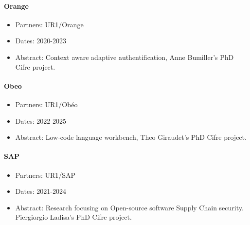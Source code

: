 \paragraph*{Orange}
\begin{participants}
\end{participants}

\begin{itemize}\itemsep0cm
	\item Partners: UR1/Orange
	\item Dates: 2020-2023
	\item Abstract: Context aware adaptive authentification,  Anne Bumiller's PhD Cifre project.
\end{itemize}


\paragraph*{Obeo}
\begin{participants}
\end{participants}

\begin{itemize}\itemsep0cm
	\item Partners: UR1/Obéo
	\item Dates: 2022-2025
	\item Abstract: Low-code language workbench, Theo Giraudet's PhD Cifre project.	 
\end{itemize}


\paragraph*{SAP}
\begin{participants}
\end{participants}
\begin{itemize}\itemsep0cm
	\item Partners: UR1/SAP
	\item Dates: 2021-2024
	\item Abstract: Research focusing on Open-source software Supply Chain security. Piergiorgio Ladisa's PhD Cifre project.	 
\end{itemize}




